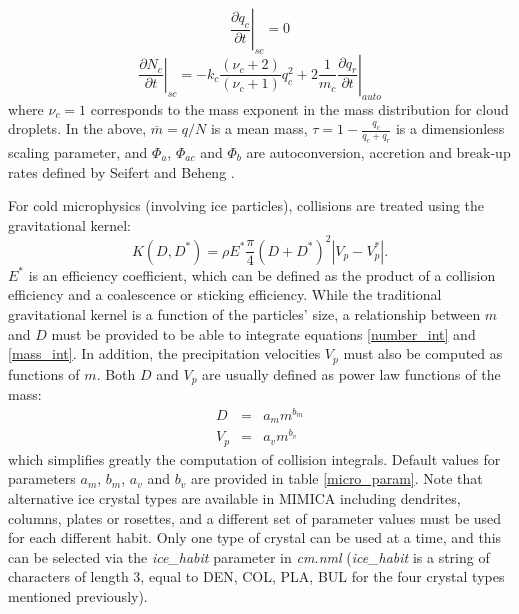 \documentclass[12pt,A4,french]{article}
\begin{document}
\begin{description}
\begin{equation}
\label{scrn}
\end{equation}
\begin{equation}
\left.\frac{\partial q_{c}}{\partial t}\right|_{sc} = 0
\label{sccq}
\end{equation}
\begin{equation}
\left.\frac{\partial N_{c}}{\partial t}\right|_{sc} = -k_{c}\frac{\left(\nu_{c}+2\right)}{\left(\nu_{c}+1\right)}q_{c}^{2} + 2 \frac{1}{m_{c}} \left.\frac{\partial q_{r}}{\partial t}\right|_{auto} 
\label{sccn}
\end{equation}
where $\nu_{c} = 1$ corresponds to the mass exponent in the mass distribution for cloud droplets. In the above, $\overline{m} = q/N$ is a mean mass, $\tau=1-\frac{q_{c}}{q_{c}+q_{r}}$ is a dimensionless scaling parameter, and $\Phi_{a}$, $\Phi_{ac}$ and $\Phi_{b}$ are autoconversion,
accretion and break-up rates defined by Seifert and Beheng \cite{SB2006}. 

For cold microphysics (involving ice particles), collisions are treated using the gravitational kernel:
\begin{equation}
K\left(D,D^{*}\right) = \rho E^{*}\frac{\pi}{4}\left(D+D^{*}\right)^{2}\left|V_{p} - V_{p}^{*}\right|.
\end{equation}
$E^{*}$ is an efficiency coefficient, which can be defined as the product of a collision efficiency and a coalescence or sticking efficiency. While the traditional gravitational kernel is a function of the particles' size, a relationship between $m$ and $D$ must be provided to be able to integrate equations \ref{number_int} and \ref{mass_int}. In addition, the precipitation velocities $V_p$ must also be computed as functions of $m$. Both $D$ and $V_p$ are usually defined as power law functions of the mass:
\begin{eqnarray}
D &=& a_m m^{b_m} \\
V_p &=& a_v m^{b_v} 
\end{eqnarray} 
which simplifies greatly the computation of collision integrals. Default values for parameters $a_m$, $b_m$, $a_v$ and $b_v$ are provided in table \ref{micro_param}. Note that alternative ice crystal types are available in MIMICA including dendrites, columns, plates or rosettes, and a different set of parameter values must be used for each different habit. Only one type of crystal can be used at a time, and this can be selected via the {\it ice\_habit} parameter in {\it cm.nml} ({\it ice\_habit} is a string of characters of length 3, equal to DEN, COL, PLA, BUL for the four crystal types mentioned previously).


\end{description}
\end{document}
